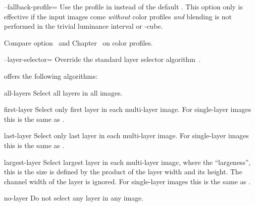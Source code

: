 \begin{codelist}
  \label{opt:fallback-profile}%
\item[--fallback-profile=\metavar{PROFILE-FILENAME}]\itemend Use the
   profile in  instead of the
  default . This option only is effective if the input images come
  \emph{without} color profiles \emph{and} blending is not performed
  in the trivial luminance interval
  or -cube.

  Compare
  option~
  and Chapter~ on color profiles.


  \label{opt:layer-selector}%
\item[--layer-selector=\metavar{ALGORITHM}]\itemend Override the
  standard layer selector algorithm~.

  \App{} offers the following algorithms:

  \begin{codelist}
  \item[all-layers\genidx{layer selection!all layers}]\itemend Select
    all layers in all images.

  \item[first-layer\genidx{layer selection!first layer}]\itemend
    Select only first layer in each multi-layer image.  For
    single-layer images this is the same as .

  \item[last-layer\genidx{layer selection!last layer}]\itemend
    Select only last layer in each multi-layer image.  For
    single-layer images this is the same as .

  \item[largest-layer\genidx{layer selection!largest-layer}]\itemend
    Select largest layer in each multi-layer image, where the
    ``largeness'', this is the size is defined by the product of the
    layer width and its height.  The channel width of the layer is
    ignored.  For single-layer images this is the same as
    .

  \item[no-layer\genidx{layer selection!no layer}]\itemend Do not
    select any layer in any image.


\end{codelist}
\end{codelist}
